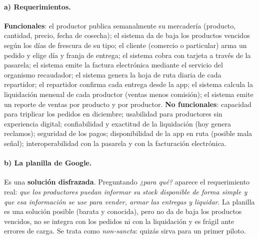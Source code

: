 \documentclass[11pt,a4paper]{article}
\begin{document}
\paragraph{a) Requerimientos.} \textbf{Funcionales}: el productor publica semanalmente su mercadería (producto,
cantidad, precio, fecha de cosecha); el sistema da de baja los productos vencidos según los días de frescura de
su tipo; el cliente (comercio o particular) arma un pedido y elige día y franja de entrega; el sistema cobra con
tarjeta a través de la pasarela; el sistema emite la factura electrónica mediante el servicio del organismo
recaudador; el sistema genera la hoja de ruta diaria de cada repartidor; el repartidor confirma cada entrega
desde la app; el sistema calcula la liquidación mensual de cada productor (ventas menos comisión); el sistema
emite un reporte de ventas por producto y por productor. \textbf{No funcionales}: capacidad para triplicar los
pedidos en diciembre; usabilidad para productores sin experiencia digital; confiabilidad y exactitud de la
liquidación (hoy genera reclamos); seguridad de los pagos; disponibilidad de la app en ruta (posible mala
señal); interoperabilidad con la pasarela y con la facturación electrónica.

\paragraph{b) La planilla de Google.} Es una \textbf{solución disfrazada}. Preguntando \emph{¿para qué?} aparece
el requerimiento real: \emph{que los productores puedan informar su stock disponible de forma simple y que esa
información se use para vender, armar las entregas y liquidar}. La planilla es una solución posible (barata y
conocida), pero no da de baja los productos vencidos, no se integra con los pedidos ni con la liquidación y es
frágil ante errores de carga. Se trata como \emph{non-sancta}: quizás sirva para un primer piloto.
\end{document}
